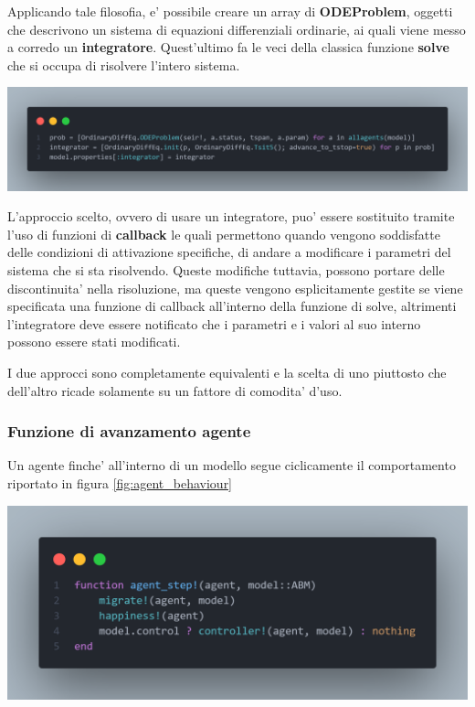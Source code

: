 Applicando tale filosofia, e' possibile creare un array di \textbf{ODEProblem}, oggetti che descrivono
un sistema di equazioni differenziali ordinarie, ai quali viene messo a corredo un \textbf{integratore}. 
Quest'ultimo fa le veci della classica funzione \textbf{solve} che si occupa di risolvere l'intero sistema.

\begin{minipage}{\linewidth}
	\centering
	\includegraphics[width=\textwidth]{img/model_ode.png}
	\label{fig:model_ode}
\end{minipage}

L'approccio scelto, ovvero di usare un integratore, puo' essere sostituito tramite
l'uso di funzioni di \textbf{callback} le quali permettono quando vengono soddisfatte delle
condizioni di attivazione specifiche, di andare a modificare i parametri del sistema che
si sta risolvendo. Queste modifiche tuttavia, possono portare delle discontinuita' nella 
risoluzione, ma queste vengono esplicitamente gestite se viene specificata una funzione 
di callback all'interno della funzione di solve, altrimenti l'integratore deve essere notificato che 
i parametri e i valori al suo interno possono essere stati modificati. 

I due approcci sono completamente equivalenti e la scelta di uno piuttosto che dell'altro
ricade solamente su un fattore di comodita' d'uso.

\subsubsection{Funzione di avanzamento agente}
Un agente finche' all'interno di un modello segue ciclicamente il comportamento
riportato in figura \ref{fig:agent_behaviour}

\begin{minipage}{\linewidth}
	\centering
	\includegraphics[width=\textwidth]{img/agent_behaviour.png}
	\label{fig:agent_behaviour}
\end{minipage}

